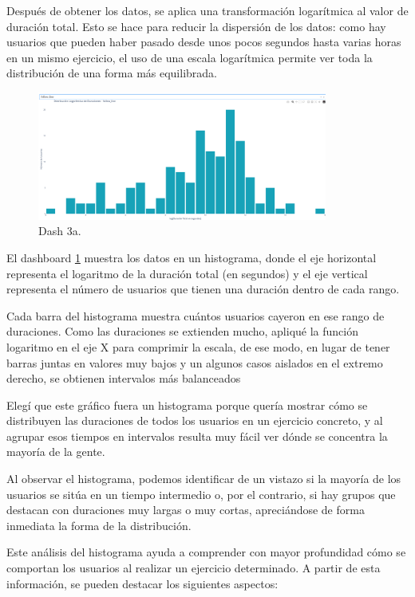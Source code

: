 \documentclass[a4paper, 12pt]{book}
\begin{document}
Después de obtener los datos, se aplica una transformación logarítmica al valor de duración total. Esto se hace para reducir la dispersión de los datos: como hay usuarios que pueden haber pasado desde unos pocos segundos hasta varias horas en un mismo ejercicio, el uso de una escala logarítmica permite ver toda la distribución de una forma más equilibrada.

\begin{figure}
  \centering
  \includegraphics[width=0.85\textwidth, keepaspectratio]{img/3a.png}
  \caption{Dash 3a.}\label{fig:3a}
\end{figure}

El dashboard \ref{fig:3a} muestra los datos en un histograma, donde el eje horizontal representa el logaritmo de la duración total (en segundos) y el eje vertical representa el número de usuarios que tienen una duración dentro de cada rango.

Cada barra del histograma muestra cuántos usuarios cayeron en ese rango de duraciones. Como las duraciones se extienden mucho, apliqué la función logaritmo en el eje X para comprimir la escala, de ese modo, en lugar de tener barras juntas en valores muy bajos y un algunos casos aislados en el extremo derecho, se obtienen intervalos más balanceados

Elegí que este gráfico fuera un histograma porque quería mostrar cómo se distribuyen las duraciones de todos los usuarios en un ejercicio concreto, y al agrupar esos tiempos en intervalos resulta muy fácil ver dónde se concentra la mayoría de la gente.

Al observar el histograma, podemos identificar de un vistazo si la mayoría de los usuarios se sitúa en un tiempo intermedio o, por el contrario, si hay grupos que destacan con duraciones muy largas o muy cortas, apreciándose de forma inmediata la forma de la distribución.

Este análisis del histograma ayuda a comprender con mayor profundidad cómo se comportan los usuarios al realizar un ejercicio determinado. A partir de esta información, se pueden destacar los siguientes aspectos:
\end{document}
